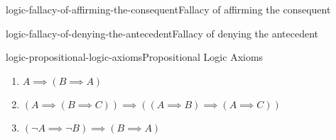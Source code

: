 \documentclass[preview]{standalone}
\begin{document}
\begin{snippetdefinition}{logic-fallacy-of-affirming-the-consequent}{Fallacy of affirming the consequent}
    \begin{prooftree}
    \end{prooftree}
\end{snippetdefinition}

\begin{snippetdefinition}{logic-fallacy-of-denying-the-antecedent}{Fallacy of denying the antecedent}
    \begin{prooftree}
    \end{prooftree}
\end{snippetdefinition}

\begin{snippetdefinition}{logic-propositional-logic-axioms}{Propositional Logic Axioms}
    \begin{enumerate}
        \item \(A \implies (B \implies A)\)
        \item \((A \implies (B \implies C)) \implies ((A \implies B) \implies (A \implies C))\)
        \item \((\lnot A \implies \lnot B) \implies (B \implies A)\)
    \end{enumerate}
\end{snippetdefinition}
\end{document}
